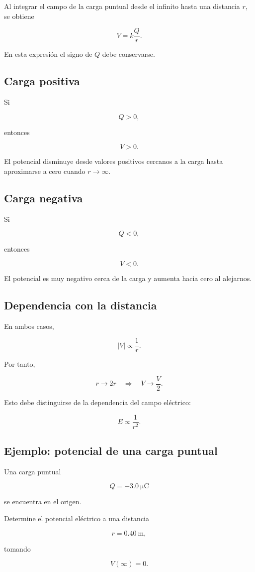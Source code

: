 Al integrar el campo de la carga puntual desde el infinito hasta una distancia \(r\),
se obtiene

\begin{equation}
\boxed{
V=k\frac{Q}{r}
}.
\end{equation}

En esta expresión el signo de \(Q\) debe conservarse.


\subsection{Carga positiva}

Si

\[
Q>0,
\]

entonces

\[
\boxed{V>0}.
\]

El potencial disminuye desde valores positivos cercanos a la carga hasta aproximarse
a cero cuando \(r\to\infty\).


\subsection{Carga negativa}

Si

\[
Q<0,
\]

entonces

\[
\boxed{V<0}.
\]

El potencial es muy negativo cerca de la carga y aumenta hacia cero al alejarnos.


\subsection{Dependencia con la distancia}

En ambos casos,

\[
\boxed{
|V|\propto\frac{1}{r}
}.
\]

Por tanto,

\[
r\to2r
\quad\Longrightarrow\quad
V\to\frac{V}{2}.
\]

Esto debe distinguirse de la dependencia del campo eléctrico:

\[
E\propto\frac{1}{r^2}.
\]


\subsection{Ejemplo: potencial de una carga puntual}

\begin{ejemplo}

Una carga puntual

\[
Q=+\SI{3.0}{\micro\coulomb}
\]

se encuentra en el origen.

Determine el potencial eléctrico a una distancia

\[
r=\SI{0.40}{\metre},
\]

tomando

\[
V(\infty)=0.
\]

\end{ejemplo}

